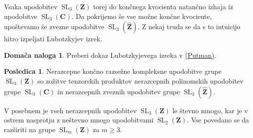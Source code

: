 \documentclass[11pt]{book}
\def\ZZ{\mathbf{Z}}
\def\CC{\mathbf{C}}
\DeclareMathOperator\SL{SL}
\theoremstyle{definition}
\theoremstyle{zgled}
\theoremstyle{zgledbrezstevilke}
\theoremstyle{odprtproblem}
\theoremstyle{domacanaloga}
\newtheorem{domacanaloga}[theorem]{Domača naloga}
\theoremstyle{izrek}
\newtheorem{posledica}[theorem]{Posledica}
\begin{document}
Vsaka upodobitev $\SL_3(\ZZ)$ torej do končnega kvocienta natančno izhaja iz upodobitve $\SL_3(\CC)$. Da pokrijemo še vse možne končne kvociente, upoštevamo še zvezne upodobitve $\SL_3(\widehat{\ZZ})$. Z nekaj truda se da s to intuicijo hitro izpeljati Lubotzkyjev izrek.

\begin{domacanaloga}
Preberi dokaz Lubotzkyjevega izreka v \href{https://www3.nd.edu/~andyp/notes/RepTheorySLnZ.pdf}{(Putman)}.
\end{domacanaloga}

\begin{posledica}
Nerazcepne končno razsežne kompleksne upodobitve grupe $\SL_3(\ZZ)$ so zožitve tenzorskih produktov nerazcepnih polinomskih upodobitev grupe $\SL_3(\CC)$ in nerazcepnih zveznih upodobitev grupe $\SL_3(\widehat{\ZZ})$.
\end{posledica}

V posebnem je vseh nerazcepnih upodobitev $\SL_3(\ZZ)$ le števno mnogo, kar je v ostrem nasprotju z neštevno mnogo upodobitvami $\SL_2(\ZZ)$. Vse povedano se da razširiti na grupe $\SL_m(\ZZ)$ za $m \geq 3$.
\end{document}
